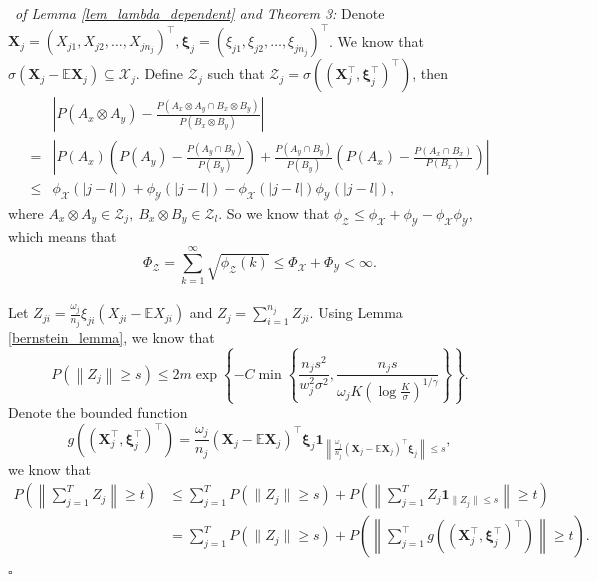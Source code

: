 \documentclass[12pt]{article}
\newenvironment{pf}{{\noindent\it Proof}\ }{\hfill $\square$\par}
\begin{document}
\begin{pf}{\it of Lemma \ref{lem_lambda_dependent} and Theorem 3:}
  Denote $\mathbf{X}_j = (X_{j1},X_{j2},\dots,X_{jn_j})^\top, \mathbf{\xi}_j= (\xi_{j1},\xi_{j2},\dots,\xi_{jn_j})^\top $. We know that $\sigma(\mathbf{X}_{j}-\mathbb{E} \mathbf{X}_{j}) \subseteq \mathcal{X}_j$. Define $ \mathcal{Z}_j$ such that $\mathcal{Z}_j = \sigma((\mathbf{X}^\top_j,\mathbf{\xi}^\top_j)^\top)$, then
  \begin{align*}
  &\left|P(A_x\otimes A_y)-\frac{P(A_x\otimes A_y\cap B_x\otimes B_y)}{P(B_x\otimes B_y)}\right|\\=&\left|P(A_x)\left(P(A_y) - \frac{P(A_y\cap B_y)}{P(B_y)}\right) + \frac{P(A_y\cap B_y)}{P(B_y)}\left(P(A_x) - \frac{P(A_x\cap B_x)}{P(B_x)}\right)\right|
  \\\le & \phi_{\mathcal{X}}(|j-l|) +\phi_{\mathcal{Y}}(|j-l|) - \phi_{\mathcal{X}}(|j-l|) \phi_{\mathcal{Y}}(|j-l|),
  \end{align*}
  where $A_x\otimes A_y \in \mathcal{Z}_j,\ B_x\otimes B_y \in \mathcal{Z}_l$.
  So we know that $\phi_{\mathcal{Z}} \le \phi_{\mathcal{X}} +\phi_{\mathcal{Y}} - \phi_{\mathcal{X}}\phi_{\mathcal{Y}}$, which means that
  \begin{equation*}
  \Phi_\mathcal{Z} = \sum_{k=1}^\infty \sqrt{\phi_{\mathcal{Z}}(k)}\le \Phi_\mathcal{X}+ \Phi_{\mathcal{Y}}<\infty.
  \end{equation*}\\
  Let $Z_{ji} = \frac{\omega_j}{n_j}\xi_{ji}\left(X_{ji} - \mathbb{E}X_{ji}\right)$ and $Z_{j} = \sum_{i=1}^{n_j} Z_{ji}$. Using Lemma \ref{bernstein_lemma}, we know that
  \begin{equation*}
  P\left(\left\|Z_{j}\right\|\ge s\right)  \le 2m \exp\left\{-C\min\left\{\frac{n_j s^2}{w^2
  _j \sigma^2}, \frac{n_j s}{\omega_j K(\log\frac{K}{\sigma})^{1/\gamma}}\right\}\right\}.
  \end{equation*}
  Denote the bounded function 
  $$g((\mathbf{X}_j^\top,\mathbf{\xi}_j^\top)^\top) = \frac{\omega_j}{n_j}(\mathbf{X}_j-\mathbb{E}\mathbf{X}_j)^\top\mathbf{\xi}_j\mathbf{1}_{\left\| \frac{\omega_j}{n_j}(\mathbf{X}_j-\mathbb{E}\mathbf{X}_j)^\top\mathbf{\xi}_j\right\|\le s},$$
  we know that
  \begin{align*}
  P\left(\left\|\sum_{j=1}^T Z_{j}\right\|\ge t \right) & \le 
  \sum_{j=1}^T P(\|Z_j\|\ge s) + P\left(\left\|\sum_{j=1}^T Z_j\mathbf{1}_{\|Z_{j}\|\le s}\right\|\ge t\right)\\&=
  \sum_{j=1}^T P(\|Z_j\|\ge s) + P\left(\left\|\sum_{j=1}^\top g((\mathbf{X}_j^\top,\mathbf{\xi}_j^\top)^\top)\right\|\ge t\right).

\end{align*}
\end{pf}
\end{document}

